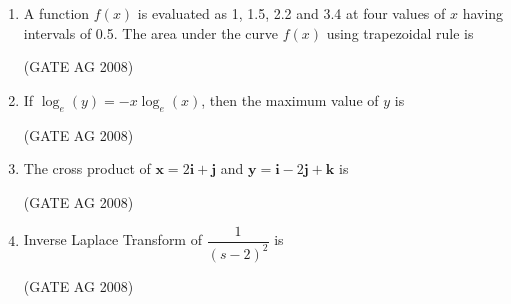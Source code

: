 \documentclass[journal,12pt,onecolumn]{IEEEtran}
\begin{document}
\begin{enumerate}
\medskip

\item 
 A function $f(x)$ is evaluated as 1, 1.5, 2.2 and 3.4 at four values of $x$ having intervals of 0.5. The area under the curve $f(x)$ using trapezoidal rule is 
\begin{enumerate}
 \end{enumerate}
 \hfill(GATE AG 2008)\\

\medskip


\item
 If $\log_e(y) = -x \log_e(x)$, then the maximum value of $y$ is 
\begin{enumerate}
\end{enumerate}
\hfill(GATE AG 2008)


\medskip

\item 
 The cross product of $\mathbf{x} = 2\mathbf{i}+\mathbf{j}$ and $\mathbf{y} = \mathbf{i}-2\mathbf{j}+\mathbf{k}$ is 
\begin{enumerate}
\end{enumerate}
\hfill(GATE AG 2008)\\

\medskip

\item 
 Inverse Laplace Transform of $\dfrac{1}{(s-2)^2}$ is 
\begin{enumerate}
\end{enumerate}
\hfill(GATE AG 2008)\\


\end{enumerate}
\end{document}
